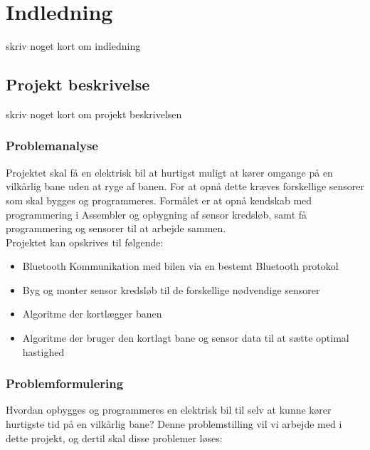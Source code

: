 \newpage

\tableofcontents
\listoftodos



\newpage
\section{Indledning}
skriv noget kort om indledning

\subsection{Projekt beskrivelse}
skriv noget kort om projekt beskrivelsen

\subsubsection{Problemanalyse}
\label{problemanalyse}
Projektet skal få en elektrisk bil at hurtigst muligt at kører omgange på en vilkårlig bane uden at ryge af banen. For at opnå dette kræves forskellige sensorer som skal bygges og programmeres. Formålet er at opnå kendskab med programmering i Assembler og opbygning af sensor kredsløb, samt få programmering og sensorer til at arbejde sammen.  \\
Projektet kan opskrives til følgende: \\

\begin{itemize}
\item Bluetooth Kommunikation med bilen via en bestemt Bluetooth protokol
\item Byg og monter sensor kredsløb til de forskellige nødvendige sensorer
\item Algoritme der kortlægger banen
\item Algoritme der bruger den kortlagt bane og sensor data til at sætte optimal hastighed
\end{itemize}


\subsubsection{Problemformulering}
\label{problemformulering}
Hvordan opbygges og programmeres en elektrisk bil til selv at kunne kører hurtigste tid på en vilkårlig bane? Denne problemstilling vil vi arbejde med i dette projekt, og dertil skal disse problemer løses: \\

